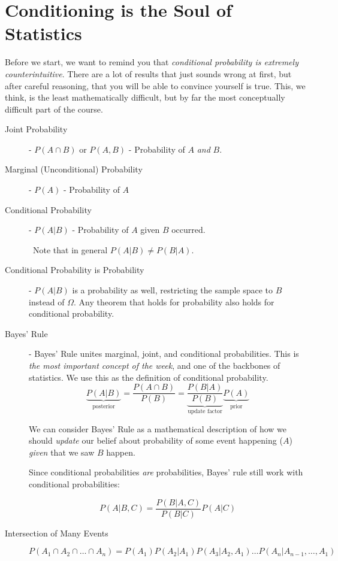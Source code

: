 \documentclass[10pt]{article}
\theoremstyle{definition}
\theoremstyle{remark}
\begin{document}
\pagebreak	
	
\section{Conditioning is the Soul of Statistics}

Before we start, we want to remind you that \textit{conditional probability is extremely counterintuitive}. There are a lot of results that just sounds wrong at first, but after careful reasoning, that you will be able to convince yourself is true. This, we think, is the least mathematically difficult, but by far the most conceptually difficult part of the course. 

	\begin{description}
		\item[Joint Probability] - $P(A \cap B) $ or $P(A, B)$ - Probability of $A$ \emph{and} $B$.
		\item[Marginal (Unconditional) Probability] - $P(A)$ - Probability of $A$
		\item[Conditional Probability] - $P(A|B)$ - Probability of $A$ given $B$ occurred.
		
		\Biohazard \ Note that in general $P(A|B) \neq P(B|A)$. 
		
		\item[Conditional Probability is Probability] - $P(A|B)$ is a probability as well, restricting the sample space to $B$ instead of $\Omega$. Any theorem that holds for probability also holds for conditional probability.
		\item[Bayes' Rule] - Bayes' Rule unites marginal, joint, and conditional probabilities. This is \emph{the most important concept of the week}, and one of the backbones of statistics. We use this as the definition of conditional probability.
	    $$ \boxed{ \underbrace{P(A|B)}_{\text{posterior}} = \frac{P(A \cap B)}{P(B)} = \underbrace{\frac{P(B|A)}{P(B)}}_{\text{update factor}} \underbrace{P(A)}_{\text{prior}} }$$
	    
	    We can consider Bayes' Rule as a mathematical description of how we should \textit{update} our belief about probability of some event happening ($A$) \textit{given} that we saw $B$ happen. 
	    
	   
	    Since conditional probabilities \textit{are} probabilities, Bayes' rule still work with conditional probabilities:
	    
	    $$ P(A|B,C) = \frac{P(B|A,C)}{P(B|C)} P(A|C) $$
	    
	    \item[Intersection of Many Events] $$P( A_1 \cap A_2 \cap \ldots \cap A_n) = P(A_1) P(A_2 | A_1) P(A_3 | A_2, A_1) \ldots P(A_n | A_{n-1}, \ldots, A_1)$$
	   
	\end{description}
\end{document}
